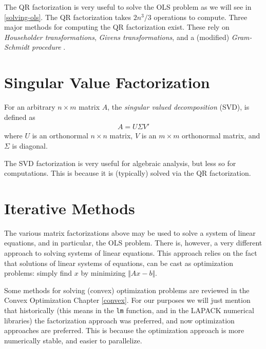\documentclass[]{book}
\theoremstyle{definition}
\theoremstyle{definition}
\theoremstyle{definition}
\theoremstyle{remark}
\let\BeginKnitrBlock\begin \let\EndKnitrBlock\end
\begin{document}
The QR factorization is very useful to solve the OLS problem as we will see in \ref{solving-ols}.
The QR factorization takes \(2n^3/3\) operations to compute.
Three major methods for computing the QR factorization exist. These rely on \emph{Householder transformations}, \emph{Givens transformations}, and a (modified) \emph{Gram-Schmidt procedure} \citep{gentle2012numerical}.

\hypertarget{singular-value-factorization}{%
\section{Singular Value Factorization}\label{singular-value-factorization}}

\BeginKnitrBlock{definition}[SVD]
\protect\hypertarget{def:svd}{}{\label{def:svd} {} }For an arbitrary \(n\times m\) matrix \(A\), the \emph{singular valued decomposition} (SVD), is defined as \begin{align}
 A = U \Sigma V' 
\end{align}
where \(U\) is an orthonormal \(n \times n\) matrix, \(V\) is an \(m \times m\) orthonormal matrix, and \(\Sigma\) is diagonal.
\EndKnitrBlock{definition}

The SVD factorization is very useful for algebraic analysis, but less so for computations.
This is because it is (typically) solved via the QR factorization.

\hypertarget{iterative-methods}{%
\section{Iterative Methods}\label{iterative-methods}}

The various matrix factorizations above may be used to solve a system of linear equations, and in particular, the OLS problem.
There is, however, a very different approach to solving systems of linear equations.
This approach relies on the fact that solutions of linear systems of equations, can be cast as optimization problems: simply find \(x\) by minimizing \(\Vert Ax-b \Vert\).

Some methods for solving (convex) optimization problems are reviewed in the Convex Optimization Chapter \ref{convex}.
For our purposes we will just mention that historically (this means in the \texttt{lm} function, and in the LAPACK numerical libraries) the factorization approach was preferred, and now optimization approaches are preferred.
This is because the optimization approach is more numerically stable, and easier to parallelize.
\end{document}
